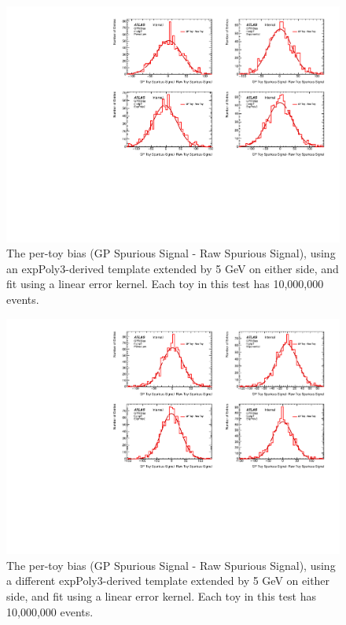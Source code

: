 \begin{figure} 
\begin{center}
  \includegraphics[width=\textwidth]{figures/background/gpr/validation/linear/ToyTest_FitSigBiases_medpT_10M_noSig}   
\caption{The per-toy bias (GP Spurious Signal - Raw Spurious Signal), using an expPoly3-derived template extended by 5 GeV on either side, and fit using a linear error kernel. Each toy in this test has 10,000,000 events.}
\label{fig:bias_linearkernel_medpt_10M_noSig}
\end{center}
\end{figure}

\begin{figure} 
\begin{center}
  \includegraphics[width=\textwidth]{figures/background/gpr/validation/linear/ToyTest_FitSigBiases_highpT_10M_noSig}   
\caption{The per-toy bias (GP Spurious Signal - Raw Spurious Signal), using a different expPoly3-derived template extended by 5 GeV on either side, and fit using a linear error kernel. Each toy in this test has 10,000,000 events.}
\label{fig:bias_linearkernel_highpt_10M_noSig}
\end{center}
\end{figure}

